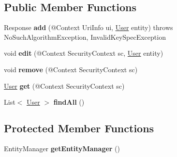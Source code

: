 \subsection*{Public Member Functions}
\begin{DoxyCompactItemize}
\item 
\hypertarget{classit_1_1polimi_1_1se_1_1calcare_1_1service_1_1UserFacadeREST_aaca56f16be182c6dbd6f9b58efbfc21a}{}Response {\bfseries add} (@Context Uri\+Info ui, \hyperlink{classit_1_1polimi_1_1se_1_1calcare_1_1entities_1_1User}{User} entity)  throws No\+Such\+Algorithm\+Exception, Invalid\+Key\+Spec\+Exception \label{classit_1_1polimi_1_1se_1_1calcare_1_1service_1_1UserFacadeREST_aaca56f16be182c6dbd6f9b58efbfc21a}

\item 
\hypertarget{classit_1_1polimi_1_1se_1_1calcare_1_1service_1_1UserFacadeREST_adecf3d47f4dbf8b92656b7b113f0b0a5}{}void {\bfseries edit} (@Context Security\+Context sc, \hyperlink{classit_1_1polimi_1_1se_1_1calcare_1_1entities_1_1User}{User} entity)\label{classit_1_1polimi_1_1se_1_1calcare_1_1service_1_1UserFacadeREST_adecf3d47f4dbf8b92656b7b113f0b0a5}

\item 
\hypertarget{classit_1_1polimi_1_1se_1_1calcare_1_1service_1_1UserFacadeREST_a14a274c408505ea91f938878535a78b7}{}void {\bfseries remove} (@Context Security\+Context sc)\label{classit_1_1polimi_1_1se_1_1calcare_1_1service_1_1UserFacadeREST_a14a274c408505ea91f938878535a78b7}

\item 
\hypertarget{classit_1_1polimi_1_1se_1_1calcare_1_1service_1_1UserFacadeREST_a3e931230f45796f19dd0daffb0ffb8b4}{}\hyperlink{classit_1_1polimi_1_1se_1_1calcare_1_1entities_1_1User}{User} {\bfseries get} (@Context Security\+Context sc)\label{classit_1_1polimi_1_1se_1_1calcare_1_1service_1_1UserFacadeREST_a3e931230f45796f19dd0daffb0ffb8b4}

\item 
\hypertarget{classit_1_1polimi_1_1se_1_1calcare_1_1service_1_1UserFacadeREST_aeee94d2e3cfeb5041d8026fca0675d4d}{}List$<$ \hyperlink{classit_1_1polimi_1_1se_1_1calcare_1_1entities_1_1User}{User} $>$ {\bfseries find\+All} ()\label{classit_1_1polimi_1_1se_1_1calcare_1_1service_1_1UserFacadeREST_aeee94d2e3cfeb5041d8026fca0675d4d}

\end{DoxyCompactItemize}
\subsection*{Protected Member Functions}
\begin{DoxyCompactItemize}
\item 
\hypertarget{classit_1_1polimi_1_1se_1_1calcare_1_1service_1_1UserFacadeREST_a111911bc228956ba9f3bf4bca11b349b}{}Entity\+Manager {\bfseries get\+Entity\+Manager} ()\label{classit_1_1polimi_1_1se_1_1calcare_1_1service_1_1UserFacadeREST_a111911bc228956ba9f3bf4bca11b349b}

\end{DoxyCompactItemize}


